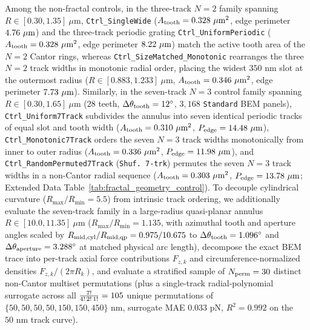 \documentclass[pdflatex,sn-nature]{sn-jnl}
\DeclareRobustCommand{\roundzero}[1]{\fpeval{round(#1,0)}}
\DeclareRobustCommand{\roundtwo}[1]{\fpeval{round(#1,2)}}
\DeclareRobustCommand{\roundthree}[1]{\fpeval{round(#1,3)}}
\begin{document}
Among the non-fractal controls, in the three-track $N=2$ family spanning $R \in [0.30, 1.35]\ \mu\text{m}$, \texttt{Ctrl\_SingleWide} ($A_{\rm tooth} = \roundthree{\FractalCtrlSinglewideActiveToothAreaUmtwo}\ \mu\text{m}^2$, edge perimeter $\roundtwo{\FractalCtrlSinglewideEdgePerimeterUm}\ \mu\text{m}$) and the three-track periodic grating \texttt{Ctrl\_UniformPeriodic} ($A_{\rm tooth} = \roundthree{\FractalCtrlUniformperiodicActiveToothAreaUmtwo}\ \mu\text{m}^2$, edge perimeter $\roundtwo{\FractalCtrlUniformperiodicEdgePerimeterUm}\ \mu\text{m}$) match the active tooth area of the $N=2$ Cantor rings, whereas \texttt{Ctrl\_SizeMatched\_Monotonic} rearranges the three $N=2$ track widths in monotonic radial order, placing the widest $350\text{ nm}$ slot at the outermost radius ($R \in [0.883, 1.233]\ \mu\text{m}$, $A_{\rm tooth} = \roundthree{\FractalCtrlSizematchedMonotonicActiveToothAreaUmtwo}\ \mu\text{m}^2$, edge perimeter $\roundtwo{\FractalCtrlSizematchedMonotonicEdgePerimeterUm}\ \mu\text{m}$). Similarly, in the seven-track $N=3$ control family spanning $R \in [0.30, 1.65]\ \mu\text{m}$ ($28$ teeth, $\Delta\theta_{\rm tooth} = 12^\circ$, $3{,}168$ \texttt{Standard} BEM panels), \texttt{Ctrl\_Uniform7Track} subdivides the annulus into seven identical periodic tracks of equal slot and tooth width ($A_{\rm tooth} = 0.310\ \mu\text{m}^2$, $P_{\rm edge} = 14.48\ \mu\text{m}$), \texttt{Ctrl\_Monotonic7Track} orders the seven $N=3$ track widths monotonically from inner to outer radius ($A_{\rm tooth} = 0.336\ \mu\text{m}^2$, $P_{\rm edge} = 11.98\ \mu\text{m}$), and \texttt{Ctrl\_RandomPermuted7Track} (\texttt{Shuf.\ 7-trk}) permutes the seven $N=3$ track widths in a non-Cantor radial sequence ($A_{\rm tooth} = 0.303\ \mu\text{m}^2$, $P_{\rm edge} = 13.78\ \mu\text{m}$; Extended Data Table~\ref{tab:fractal_geometry_control}). To decouple cylindrical curvature ($R_{\max}/R_{\min} = 5.5$) from intrinsic track ordering, we additionally evaluate the seven-track family in a large-radius quasi-planar annulus $R \in [10.0, 11.35]\ \mu\text{m}$ ($R_{\max}/R_{\min} = 1.135$, with azimuthal tooth and aperture angles scaled by $R_{\rm mid,cyl}/R_{\rm mid,qp} = 0.975/10.675$ to $\Delta\theta_{\rm tooth} = 1.096^\circ$ and $\Delta\theta_{\rm aperture} = 3.288^\circ$ at matched physical arc length), decompose the exact BEM trace into per-track axial force contributions $F_{z,k}$ and circumference-normalized densities $F_{z,k}/(2\pi R_k)$, and evaluate a stratified sample of $N_{\rm perm} = \roundzero{\NthreePermNEvaluated}$ distinct non-Cantor multiset permutations (plus a single-track radial-polynomial surrogate across all $\frac{7!}{4!\,2!\,1!} = \roundzero{\NthreePermNUniqueMultiset}$ unique permutations of $\{50, 50, 50, 50, 150, 150, 450\}\text{ nm}$, surrogate MAE $0.033\text{ pN}$, $R^2 = 0.992$ on the $50\text{ nm}$ track curve).
\end{document}
